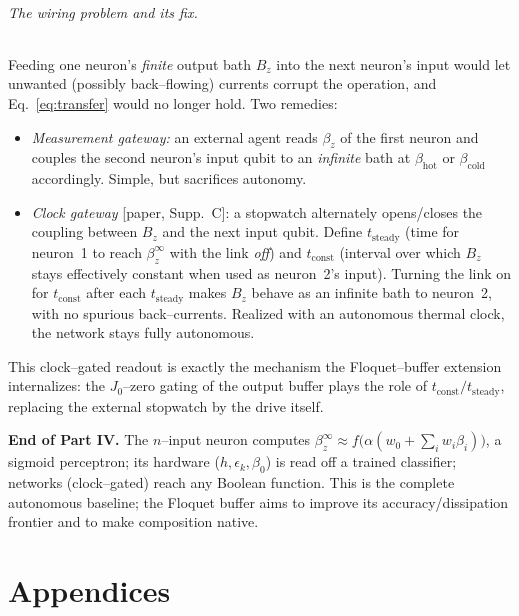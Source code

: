 \documentclass[11pt,a4paper]{article}
\theoremstyle{definition}
\theoremstyle{remark}
\begin{document}
\paragraph{The wiring problem and its fix.}
Feeding one neuron's \emph{finite} output bath $B_z$ into the next
neuron's input would let unwanted (possibly back--flowing) currents
corrupt the operation, and Eq.~\eqref{eq:transfer} would no longer hold.
Two remedies:
\begin{itemize}[leftmargin=*]
\item \emph{Measurement gateway:} an external agent reads $\beta_z$ of
the first neuron and couples the second neuron's input qubit to an
\emph{infinite} bath at $\beta_{\mathrm{hot}}$ or $\beta_{\mathrm{cold}}$
accordingly. Simple, but sacrifices autonomy.
\item \emph{Clock gateway} [paper, Supp.~C]: a stopwatch alternately
opens/closes the coupling between $B_z$ and the next input qubit. Define
$t_{\mathrm{steady}}$ (time for neuron~1 to reach $\beta_z^\infty$ with
the link \emph{off}) and $t_{\mathrm{const}}$ (interval over which $B_z$
stays effectively constant when used as neuron~2's input). Turning the
link on for $t_{\mathrm{const}}$ after each $t_{\mathrm{steady}}$ makes
$B_z$ behave as an infinite bath to neuron~2, with no spurious
back--currents. Realized with an autonomous thermal clock, the network
stays fully autonomous.
\end{itemize}
This clock--gated readout is exactly the mechanism the Floquet--buffer
extension internalizes: the $J_0$--zero gating of the output buffer plays
the role of $t_{\mathrm{const}}/t_{\mathrm{steady}}$, replacing the
external stopwatch by the drive itself.

\begin{keybox}
\textbf{End of Part IV.} The $n$--input neuron computes
$\beta_z^\infty\approx f\!\big(\alpha(w_0+\sum_i w_i\beta_i)\big)$, a
sigmoid perceptron; its hardware ($h,\epsilon_k,\beta_0$) is read off a
trained classifier; networks (clock--gated) reach any Boolean function.
This is the complete autonomous baseline; the Floquet buffer aims to
improve its accuracy/dissipation frontier and to make composition
native.
\end{keybox}

\appendix
\part*{Appendices}
\end{document}
